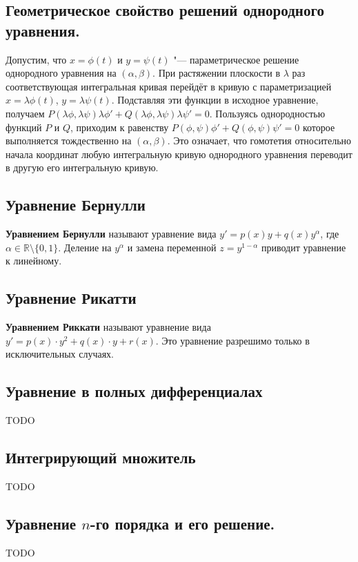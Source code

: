 \documentclass{article}
\begin{document}
\subsection{Геометрическое свойство решений однородного уравнения.}
Допустим, что $x = \phi(t)$ и $y = \psi(t)$ "--- параметрическое решение однородного уравнения на $(\alpha, \beta)$. При растяжении
плоскости в $\lambda$ раз соответствующая интегральная кривая перейдёт в кривую с параметризацией $x = \lambda \phi(t)$, $y = \lambda \psi(t)$. Подставляя эти функции в исходное уравнение, получаем $P(\lambda \phi, \lambda \psi)\lambda \phi' + Q(\lambda\phi, \lambda\psi)\lambda\psi' = 0$.
Пользуясь однородностью функций $P$ и $Q$, приходим к равенству $P(\phi, \psi)\phi' + Q(\phi, \psi)\psi' = 0$ которое выполняется тождественно на $(\alpha, \beta)$. Это означает, что гомотетия относительно начала координат любую интегральную кривую однородного уравнения переводит в другую его интегральную кривую.

\subsection{Уравнение Бернулли}
\textbf{Уравнением Бернулли} называют уравнение вида $y' = p(x)y + q(x)y^{\alpha}$, где $\alpha \in \mathbb{R}\setminus\{0, 1\}$. Деление на $y^{\alpha}$ и замена переменной $z = y^{1-\alpha}$ приводит уравнение к линейному.

\subsection{Уравнение Рикатти}
\textbf{Уравнением Риккати} называют уравнение вида $y' = p(x)\cdot y^2 + q(x)\cdot y + r(x)$. Это уравнение разрешимо только в исключительных случаях.

\subsection{Уравнение в полных дифференциалах}
TODO

\subsection{Интегрирующий множитель}
TODO

\subsection{Уравнение $n$-го порядка и его решение.}
TODO
\end{document}
